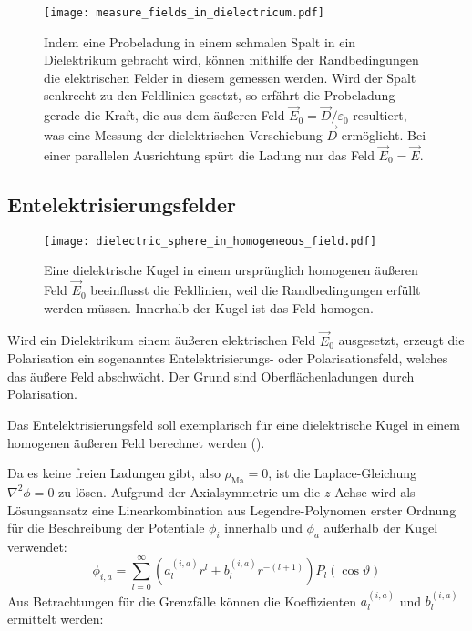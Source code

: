 \begin{figure}[htb]
	\centering
	\texttt{[image: measure\_fields\_in\_dielectricum.pdf]}
	\caption{Indem eine Probeladung in einem schmalen Spalt in ein Dielektrikum gebracht wird, können mithilfe der Randbedingungen die elektrischen Felder in diesem gemessen werden. Wird der Spalt senkrecht zu den Feldlinien gesetzt, so erfährt die Probeladung gerade die Kraft, die aus dem äußeren Feld $\vec E_0=\vec D/\varepsilon_0$ resultiert, was eine Messung der dielektrischen Verschiebung $\vec D$ ermöglicht. Bei einer parallelen Ausrichtung spürt die Ladung nur das Feld $\vec E_0=\vec E$. }
	\label{fig:measure_fields_in_dielectricum}
\end{figure}




\subsection{Entelektrisierungsfelder}


\begin{figure}[htb]
	\centering
	\texttt{[image: dielectric\_sphere\_in\_homogeneous\_field.pdf]}
	\caption{Eine dielektrische Kugel in einem ursprünglich homogenen äußeren Feld $\vec E_0$ beeinflusst die Feldlinien, weil die Randbedingungen erfüllt werden müssen. Innerhalb der Kugel ist das Feld homogen. }
	\label{fig:dielectric_sphere_in_homogeneous_field}
\end{figure}

Wird ein Dielektrikum einem äußeren elektrischen Feld $\vec {E}_{0}$ ausgesetzt, erzeugt die Polarisation ein sogenanntes Entelektrisierungs- oder Polarisationsfeld, welches das äußere Feld abschwächt. Der Grund sind Oberflächenladungen durch Polarisation.

Das Entelektrisierungsfeld soll exemplarisch für eine dielektrische Kugel in einem homogenen äußeren Feld berechnet werden ().

Da es keine freien Ladungen gibt, also $\rho _{\mathrm{Ma}}=0$, ist die Laplace-Gleichung $\nabla ^{2}\phi =0$ zu lösen. Aufgrund der Axialsymmetrie um die $z$-Achse wird als Lösungsansatz eine Linearkombination aus Legendre-Polynomen erster Ordnung für die Beschreibung der Potentiale $\phi _{i}$ innerhalb und $\phi _{a}$ außerhalb der Kugel verwendet:
\begin{equation*}
	\phi _{i,a}=\sum _{l=0}^{\infty }\left(a_{l}^{\left(i,a\right)}r^{l}+b_{l}^{\left(i,a\right)}r^{-\left(l+1\right)}\right)P_{l}\left(\cos \vartheta \right)
\end{equation*}
Aus Betrachtungen für die Grenzfälle können die Koeffizienten $a_{l}^{\left(i,a\right)}$ und $b_{l}^{\left(i,a\right)}$ ermittelt werden:

